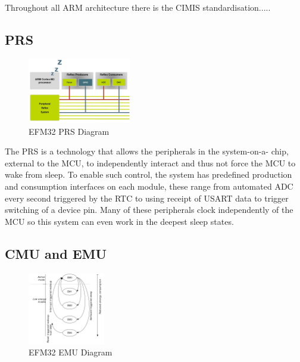 Throughout all ARM architecture there is the CIMIS standardisation.....

\cite{Sadasivan 2006} \cite{Arm2012, EnergyMicro2011}


\subsection{\acf{PRS}}

\begin{figure}
  \vspace{-10pt}
  \begin{center}
    \includegraphics[width=0.4\textwidth, keepaspectratio=true]{images/peripheralreflexsystem_croped.jpg}
  \end{center}
  \caption[EFM32 \ac{PRS} Diagram]{EFM32 \ac{PRS} Diagram \cite{EFM32Tech}}
  \vspace{-10pt}
\end{figure}

The \ac{PRS} is a technology that allows the peripherals in the system-on-a-
chip, external to the \ac{MCU}, to independently interact and thus not force the \ac{MCU} to wake from
sleep. To enable such control, the system has predefined production and consumption interfaces on
each module, these range from automated ADC every second triggered by the \ac{RTC} to using receipt
of \ac{USART} data to trigger switching of a device pin. Many of these peripherals clock independently of
the \ac{MCU} so this system can even work in the deepest sleep states.

\subsection{\acf{CMU} and \acf{EMU}}

\begin{figure}
  \vspace{-10pt}
  \begin{center}
    \includegraphics[width=0.3\textwidth, keepaspectratio=true]{images/efm32_sleep_states.png}
  \end{center}
  \caption[EFM32 \ac{EMU} Diagram]{EFM32 \ac{EMU} Diagram \cite{EFM32Ref}}
  \vspace{-10pt}
\end{figure}

